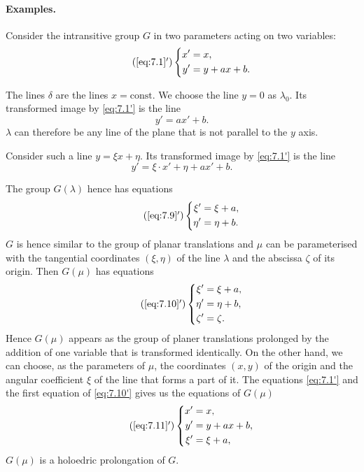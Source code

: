 \paragraph{Examples.}
\label{sec:104}
{\small
Consider the intransitive group $G$ in two parameters acting on two variables:
\begin{equation}
  \label{eq:7.1'}\tag{\ref{eq:7.1}$'$}
  \left\{
    \begin{aligned}
      x'&=x,\\
      y'&=y+ax+b.
    \end{aligned}
  \right.
\end{equation}

The lines $\delta$ are the lines $x=\text{const}$. We choose the line $y=0$ as $\lambda_{0}$. Its transformed image by \eqref{eq:7.1'} is the line
\[
y'=ax'+b.
\]
$\lambda$ can therefore be any line of the plane that is not parallel to the $y$ axis.

Consider such a line $y=\xi x+\eta$. Its transformed image by \eqref{eq:7.1'} is the line
\[
y'=\xi\cdot x'+\eta+a x'+b.
\]

The group $G(\lambda)$ hence has equations
\begin{equation}
  \label{eq:7.9'}\tag{\ref{eq:7.9}$'$}
  \left\{
    \begin{aligned}
      \xi'&=\xi+a,\\
      \eta'&=\eta+b.
    \end{aligned}
  \right.
\end{equation}
$G$ is hence similar to the group of planar translations and $\mu$ can be parameterised with the tangential coordinates $(\xi, \eta)$ of the line $\lambda$ and the abscissa $\zeta$ of its origin. Then $G(\mu)$ has equations
\begin{equation}
  \label{eq:7.10'}\tag{\ref{eq:7.10}$'$}
  \left\{
    \begin{aligned}
      \xi'&=\xi+a,\\
      \eta'&=\eta+b,\\
      \zeta'&=\zeta.
    \end{aligned}
  \right.
\end{equation}
Hence $G(\mu)$ appears as the group of planer translations prolonged by the addition of one variable that is transformed identically. On the other hand, we can choose, as the parameters of $\mu$, the coordinates $(x,y)$ of the origin and the angular coefficient $\xi$ of the line that forms a part of it. The equations \eqref{eq:7.1'} and the first equation of \eqref{eq:7.10'} gives us the equations of $G(\mu)$
\begin{equation}
  \label{eq:7.11'}\tag{\ref{eq:7.11}$'$}
  \left\{
    \begin{aligned}
      x'&=x,\\
      y'&=y+ax+b,\\
      \xi'&=\xi+a,
    \end{aligned}
  \right.
\end{equation}
$G(\mu)$ is a holoedric prolongation of $G$.

}
